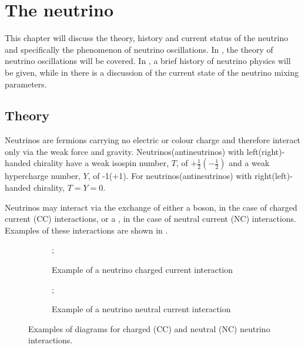 \chapter{The neutrino}
\label{sec:theory}

This chapter will discuss the theory, history and current status of the neutrino and specifically the phenomenon of neutrino oscillations.
In , the theory of neutrino oscillations will be covered.
In , a brief history of neutrino physics will be given, while in  there is a discussion of the current state of the neutrino mixing parameters.

\section{Theory}
\label{sec:theory:theory}

Neutrinos are fermions carrying no electric or colour charge and therefore interact only via the weak force and gravity.
Neutrinos(antineutrinos) with left(right)-handed chirality have a weak isospin number, $T$, of $+\frac{1}{2}\left(-\frac{1}{2}\right)$ and a weak hypercharge number, $Y$, of -1(+1).
For neutrinos(antineutrinos) with right(left)-handed chirality, $T = Y = 0$.

Neutrinos may interact via the exchange of either a \wpm boson, in the case of charged current (CC) interactions, or a \zboson, in the case of neutral current (NC) interactions.
Examples of these interactions are shown in .

\begin{figure}[h]
  \centering
  \begin{subfigure}[t]{.49\textwidth}
    \centering
    ;
    \caption{Example of a neutrino charged current interaction}
  \end{subfigure}
  \hfill
  \begin{subfigure}[t]{.49\textwidth}
    \centering
    ;    
    \caption{Example of a neutrino neutral current interaction}
  \end{subfigure}
  \caption[Examples of diagrams for charged (CC) and neutral (NC) neutrino interactions.]{Examples of diagrams for charged (CC) and neutral (NC) neutrino interactions.}
  \label{fig:nuIntEx}
\end{figure}

